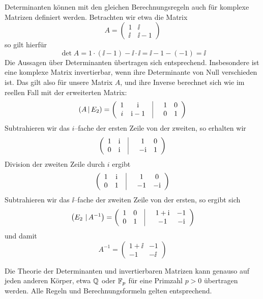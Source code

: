 \begin{notiz} Determinanten können mit den gleichen Berechnungsregeln auch für komplexe Matrizen 
definiert werden. Betrachten wir etwa die Matrix 
  	$$ A = \left( \begin{matrix} 1 & \ii \\ \ii & \ii-1 \end{matrix} \right) $$
so gilt hierfür
  	$$ \det{A} = 1 \cdot (\ii-1) - \ii \cdot \ii = \ii -1 - (-1) = \ii $$
Die Aussagen über Determinanten übertragen sich entsprechend. Insbesondere ist eine komplexe Matrix 
invertierbar, wenn ihre Determinante von Null verschieden ist. Das gilt also für unsere Matrix $A$, und 
ihre Inverse berechnet sich wie im reellen Fall mit der erweiterten Matrix:
  	$$ \left( A \, \vert \, E_2 \right) = \left( \begin{array} {c c | c c } 1 & \ii \phantom{x}& \quad  1 & 0 \\ 
	i & \ii-1 \phantom{x}& \quad 0 & 1 \end{array} \right) $$
Subtrahieren wir das $i$--fache der ersten Zeile von der zweiten, so erhalten wir
  	$$ \left(\begin{array} {c c | c c }  1 & \ii \phantom{x}& \quad  1 & 0 \\ 
	0 & \ii \phantom{x}& \quad  -\ii & 1 \end{array} \right) $$
Division der zweiten Zeile durch $i$ ergibt
  	$$ \left(\begin{array} {c c | c c }  1 & \ii \phantom{x}& \quad  1 & 0 \\ 
	0 & 1 \phantom{x}& \quad  -1 & -\ii \end{array} \right) $$
Subtrahieren wir das $\ii$--fache der zweiten Zeile von der ersten, so ergibt sich 
  	$$  \left( E_2 \, \, \vert \, A^{-1} \right) = \left( \begin{array} {c c | c c }  1 & 0 \phantom{x}& \quad  1+\ii & -1 \\ 
	0 & 1 \phantom{x}& \quad  -1 & -\ii \end{array} \right) $$
und damit
  	$$ A^{-1} = \left( \begin{matrix} 1+\ii & -1 \\  -1 & -\ii \end{matrix} \right) $$
\end{notiz}

\medbreak

\begin{notiz}
Die Theorie der Determinanten und invertierbaren Matrizen kann genauso auf jeden anderen Körper, etwa 
$\mathbb Q$ oder $\mathbb F_p$ für eine Primzahl $p> 0$ übertragen werden. Alle Regeln und Berechnungsformeln 
gelten entsprechend.
\end{notiz}

